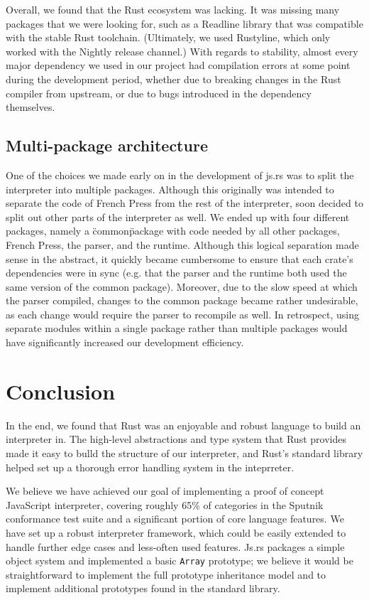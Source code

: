 \documentclass{article}
\begin{document}
\begin{multicols}{2}
Overall, we found that the Rust ecosystem was lacking. It was missing many
packages that we were looking for, such as a Readline library that was
compatible with the stable Rust toolchain. (Ultimately, we used
Rustyline\cite{rustyline}, which only worked with the Nightly release channel.)
With regards to stability, almost every major dependency we used in our project
had compilation errors at some point during the development period, whether due
to breaking changes in the Rust compiler from upstream, or due to bugs
introduced in the dependency themselves.

\subsection*{Multi-package architecture}

One of the choices we made early on in the development of js.rs was to split the
interpreter into multiple packages. Although this originally was intended to
separate the code of French Press from the rest of the interpreter, soon decided
to split out other parts of the interpreter as well. We ended up with four
different packages, namely a \"common\" package with code needed by all other
packages, French Press, the parser, and the runtime. Although this logical
separation made sense in the abstract, it quickly became cumbersome to ensure
that each crate's dependencies were in sync (e.g. that the parser and the
runtime both used the same version of the common package). Moreover, due to the
slow speed at which the parser compiled, changes to the common package became
rather undesirable, as each change would require the parser to recompile as
well. In retrospect, using separate modules within a single package rather than
multiple packages would have significantly increased our development efficiency.

\section{Conclusion}

In the end, we found that Rust was an enjoyable and robust language to build an
interpreter in. The high-level abstractions and type system that Rust provides
made it easy to bulld the structure of our interpreter, and Rust's standard
library helped set up a thorough error handling system in the inteprreter.
\newline

We believe we have achieved our goal of implementing a proof of concept
JavaScript interpreter, covering roughly 65\% of categories in the Sputnik
conformance test suite and a significant portion of core language features. We
have set up a robust interpreter framework, which could be easily extended to
handle further edge cases and less-often used features. Js.rs packages a simple
object system and implemented a basic \texttt{Array} prototype; we believe it
would be straightforward to implement the full prototype inheritance model and
to implement additional prototypes found in the standard library.


\end{multicols}
\end{document}
